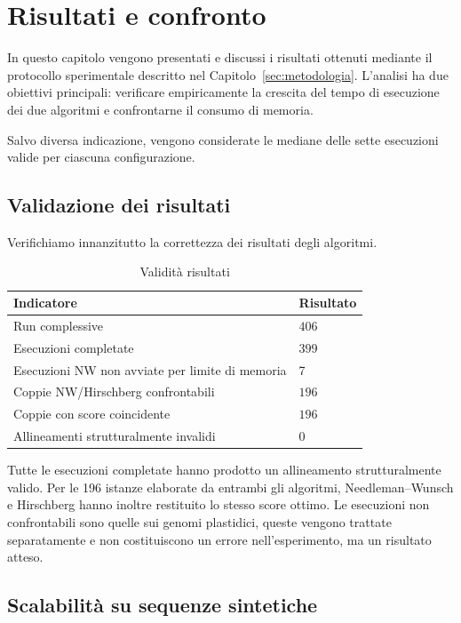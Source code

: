 \section{Risultati e confronto}

In questo capitolo vengono presentati e discussi i risultati ottenuti mediante il protocollo sperimentale descritto nel Capitolo~\ref{sec:metodologia}.
L'analisi ha due obiettivi principali: verificare empiricamente la crescita del tempo di esecuzione dei due algoritmi e confrontarne il 
consumo di memoria. 

Salvo diversa indicazione, vengono considerate le mediane delle sette esecuzioni valide per ciascuna configurazione.

\subsection{Validazione dei risultati}

Verifichiamo innanzitutto la correttezza dei risultati degli algoritmi.

\begin{table}[h]
    \centering
    \begin{tabular}{ll}
        \hline
        \textbf{Indicatore} & \textbf{Risultato} \\
        \hline
        Run complessive & $406$ \\
        Esecuzioni completate & $399$ \\
        Esecuzioni NW non avviate per limite di memoria & 7 \\
        Coppie NW/Hirschberg confrontabili & $196$ \\
        Coppie con score coincidente & $196$ \\
        Allineamenti strutturalmente invalidi & 0 \\
        \hline
    \end{tabular}
    \caption{Validità risultati}
    \label{tab:verifica_risultati}
\end{table}

Tutte le esecuzioni completate hanno prodotto un allineamento strutturalmente valido. Per le 196 istanze elaborate da entrambi gli algoritmi,
Needleman--Wunsch e Hirschberg hanno inoltre restituito lo stesso score ottimo.
Le esecuzioni non confrontabili sono quelle sui genomi plastidici, queste vengono trattate separatamente e non costituiscono un errore nell'esperimento,
ma un risultato atteso.

\subsection{Scalabilità su sequenze sintetiche}

